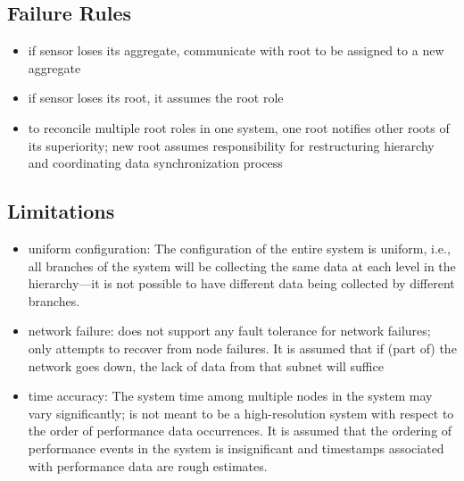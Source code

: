 \subsection{Failure Rules}
\begin{itemize}
\item if sensor loses its aggregate, communicate with root to be assigned to a new aggregate
\item if sensor loses its root, it assumes the root role
\item to reconcile multiple root roles in one system, one root notifies other roots of its superiority; new root assumes responsibility for restructuring hierarchy and coordinating data synchronization process
\end{itemize}

\subsection{Limitations}
\begin{itemize}
\item uniform configuration: The configuration of the entire system is uniform, i.e., all branches of the system will be collecting the same data at each level in the hierarchy---it is not possible to have different data being collected by different branches.
\item network failure: \dcamp does not support any fault tolerance for network failures; \dcamp only attempts to recover from node failures. It is assumed that if (part of) the network goes down, the lack of data from that subnet will suffice
\item time accuracy: The system time among multiple nodes in the system may vary significantly; \dcamp is not meant to be a high-resolution system with respect to the order of performance data occurrences. It is assumed that the ordering of performance events in the system is insignificant and timestamps associated with performance data are rough estimates.
\end{itemize}

